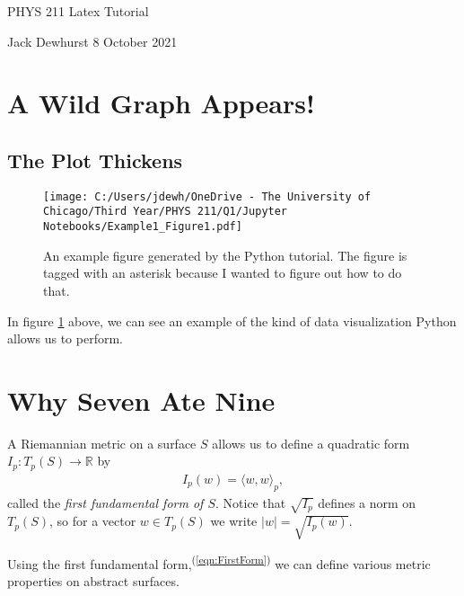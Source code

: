 \documentclass[letter]{article}
\newcommand{\IP}[1]{\langle #1 \rangle}
\begin{document}

\begin{center}
	{\large PHYS 211 Latex Tutorial}
	
	Jack Dewhurst \hspace{1cm}
	8 October 2021
	
	\vspace{5mm}
\end{center}
	

\section{A Wild Graph Appears!}

\subsection{The Plot Thickens}

\begin{figure}[h]
    \centering
    \texttt{[image: C:/Users/jdewh/OneDrive - The University of Chicago/Third Year/PHYS 211/Q1/Jupyter Notebooks/Example1\_Figure1.pdf]}
    \floattag{(\textasteriskcentered)}
    \caption{An example figure generated by the Python tutorial. The figure is tagged with an asterisk because I wanted to figure out how to do that.}
    \label{fig:ex1}
\end{figure}

In figure \ref{fig:ex1} above, we can see an example of the kind of data visualization Python allows us to perform. \lipsum[1]


\section{Why Seven Ate Nine}

    A Riemannian metric on a surface $S$ allows us to define a quadratic form $I_p : T_p(S) \to \mathbb{R}$ by
\begin{align} \label{eqn:FirstForm}
I_p (w) = \IP{w,w}_p,
\end{align}
called the \textit{first fundamental form of $S$}. Notice that $\sqrt{I_p}$ defines a norm on $T_p(S)$, so for a vector $w \in T_p(S)$ we write $|w| = \sqrt{I_p(w)}$. 

    Using the first fundamental form,\textsuperscript{(\ref{eqn:FirstForm})} we can define various metric properties on abstract surfaces. 
\end{document}
